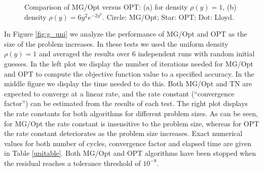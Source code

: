 \documentclass{siamltex}
\begin{document}
\begin{figure}[h]
  \centering
  \caption{Comparison of MG/Opt versus OPT: (a) for density $\rho(y) = 1$, (b) density $\rho(y) = 6y^{2}e^{-2y^{3}}$.    Circle: MG/Opt; Star: OPT; Dot: Lloyd.}
  \label{fig:unieval}
\end{figure}


In Figure \ref{fig:g_uni} we analyze the performance of MG/Opt and OPT as the size of the problem increases.  In these tests we used the uniform density $\rho(y) = 1$ and averaged the results over 6 independent runs with random initial guesses.  In the left plot we display the number of iterations needed for MG/Opt and OPT to compute the objective function value to a specified accuracy.  In the middle figure we display the time needed to do this.  Both MG/Opt and TN are expected to converge at a linear rate, and the rate constant (``convergence factor'') can be estimated from the results of each test.  The right plot displays the rate constants for both algorithms for different problem sizes.  As can be seen, for MG/Opt the rate constant is insensitive to the problem size, whereas for OPT the rate constant deteriorates as the problem size increases. Exact numerical values for both number of cycles, convergence factor and elapsed time are given in Table \ref{unitable}. Both MG/Opt and OPT algorithms have been stopped when the residual reaches a tolerance threshold of $10^{-8}$.
\end{document}
